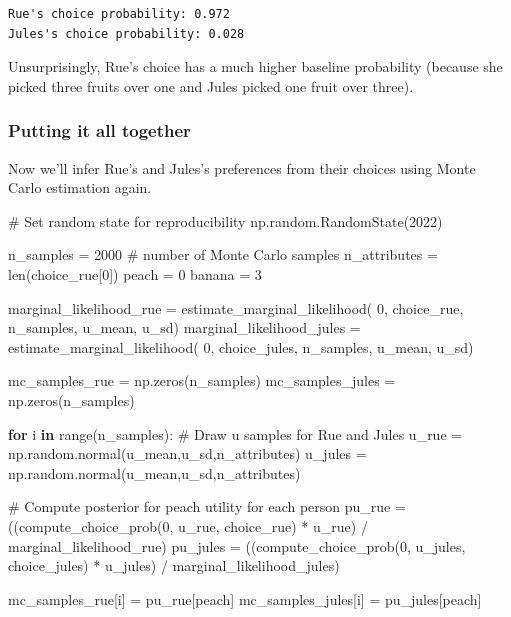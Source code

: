 \documentclass[
  letterpaper,
  DIV=11,
  numbers=noendperiod]{scrreprt}
\newenvironment{Shaded}{\begin{snugshade}}{\end{snugshade}}
\newcommand{\BuiltInTok}[1]{\textcolor[rgb]{0.00,0.23,0.31}{#1}}
\newcommand{\CommentTok}[1]{\textcolor[rgb]{0.37,0.37,0.37}{#1}}
\newcommand{\ControlFlowTok}[1]{\textcolor[rgb]{0.00,0.23,0.31}{\textbf{#1}}}
\newcommand{\DecValTok}[1]{\textcolor[rgb]{0.68,0.00,0.00}{#1}}
\newcommand{\KeywordTok}[1]{\textcolor[rgb]{0.00,0.23,0.31}{\textbf{#1}}}
\newcommand{\NormalTok}[1]{\textcolor[rgb]{0.00,0.23,0.31}{#1}}
\newcommand{\OperatorTok}[1]{\textcolor[rgb]{0.37,0.37,0.37}{#1}}
\begin{document}
\begin{verbatim}
Rue's choice probability: 0.972
Jules's choice probability: 0.028
\end{verbatim}

Unsurprisingly, Rue's choice has a much higher baseline probability
(because she picked three fruits over one and Jules picked one fruit
over three).

\subsubsection{Putting it all together}\label{putting-it-all-together}

Now we'll infer Rue's and Jules's preferences from their choices using
Monte Carlo estimation again.

\begin{Shaded}
\begin{Highlighting}[]
\CommentTok{\# Set random state for reproducibility}
\NormalTok{np.random.RandomState(}\DecValTok{2022}\NormalTok{) }

\NormalTok{n\_samples }\OperatorTok{=} \DecValTok{2000} \CommentTok{\# number of Monte Carlo samples}
\NormalTok{n\_attributes }\OperatorTok{=} \BuiltInTok{len}\NormalTok{(choice\_rue[}\DecValTok{0}\NormalTok{])}
\NormalTok{peach }\OperatorTok{=} \DecValTok{0}
\NormalTok{banana }\OperatorTok{=} \DecValTok{3}

\NormalTok{marginal\_likelihood\_rue }\OperatorTok{=}\NormalTok{ estimate\_marginal\_likelihood(}
  \DecValTok{0}\NormalTok{, choice\_rue, n\_samples, u\_mean, u\_sd)}
\NormalTok{marginal\_likelihood\_jules }\OperatorTok{=}\NormalTok{ estimate\_marginal\_likelihood(}
  \DecValTok{0}\NormalTok{, choice\_jules, n\_samples, u\_mean, u\_sd)}

\NormalTok{mc\_samples\_rue }\OperatorTok{=}\NormalTok{ np.zeros(n\_samples)}
\NormalTok{mc\_samples\_jules }\OperatorTok{=}\NormalTok{ np.zeros(n\_samples)}

\ControlFlowTok{for}\NormalTok{ i }\KeywordTok{in} \BuiltInTok{range}\NormalTok{(n\_samples):}
  \CommentTok{\# Draw u samples for Rue and Jules}
\NormalTok{  u\_rue }\OperatorTok{=}\NormalTok{ np.random.normal(u\_mean,u\_sd,n\_attributes)}
\NormalTok{  u\_jules }\OperatorTok{=}\NormalTok{ np.random.normal(u\_mean,u\_sd,n\_attributes)}
  
  \CommentTok{\# Compute posterior for peach utility for each person}
\NormalTok{  pu\_rue }\OperatorTok{=}\NormalTok{ ((compute\_choice\_prob(}\DecValTok{0}\NormalTok{, u\_rue, choice\_rue) }\OperatorTok{*}\NormalTok{ u\_rue) }\OperatorTok{/} 
\NormalTok{    marginal\_likelihood\_rue)}
\NormalTok{  pu\_jules }\OperatorTok{=}\NormalTok{ ((compute\_choice\_prob(}\DecValTok{0}\NormalTok{, u\_jules, choice\_jules) }\OperatorTok{*}\NormalTok{ u\_jules) }\OperatorTok{/}
\NormalTok{    marginal\_likelihood\_jules)}

\NormalTok{  mc\_samples\_rue[i] }\OperatorTok{=}\NormalTok{ pu\_rue[peach]}
\NormalTok{  mc\_samples\_jules[i] }\OperatorTok{=}\NormalTok{ pu\_jules[peach]}
\end{Highlighting}
\end{Shaded}
\end{document}
